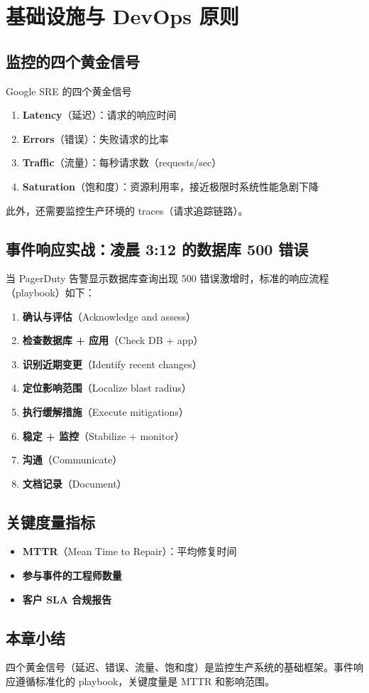 \section{基础设施与 DevOps 原则}

\subsection{监控的四个黄金信号}

\begin{importantbox}{Google SRE 的四个黄金信号}
\begin{enumerate}
    \item \textbf{Latency}（延迟）：请求的响应时间
    \item \textbf{Errors}（错误）：失败请求的比率
    \item \textbf{Traffic}（流量）：每秒请求数（requests/sec）
    \item \textbf{Saturation}（饱和度）：资源利用率，接近极限时系统性能急剧下降
\end{enumerate}
此外，还需要监控生产环境的 traces（请求追踪链路）。
\end{importantbox}

\subsection{事件响应实战：凌晨 3:12 的数据库 500 错误}

当 PagerDuty 告警显示数据库查询出现 500 错误激增时，标准的响应流程（playbook）如下：

\begin{enumerate}
    \item \textbf{确认与评估}（Acknowledge and assess）
    \item \textbf{检查数据库 + 应用}（Check DB + app）
    \item \textbf{识别近期变更}（Identify recent changes）
    \item \textbf{定位影响范围}（Localize blast radius）
    \item \textbf{执行缓解措施}（Execute mitigations）
    \item \textbf{稳定 + 监控}（Stabilize + monitor）
    \item \textbf{沟通}（Communicate）
    \item \textbf{文档记录}（Document）
\end{enumerate}

\subsection{关键度量指标}

\begin{itemize}
    \item \textbf{MTTR}（Mean Time to Repair）：平均修复时间
    \item \textbf{参与事件的工程师数量}
    \item \textbf{客户 SLA 合规报告}
\end{itemize}

\subsection{本章小结}

四个黄金信号（延迟、错误、流量、饱和度）是监控生产系统的基础框架。事件响应遵循标准化的 playbook，关键度量是 MTTR 和影响范围。

